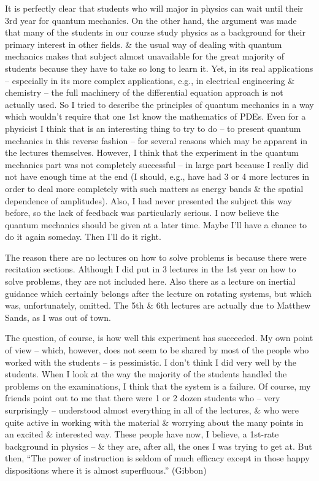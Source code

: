 \documentclass{article}
\begin{document}
It is perfectly clear that students who will major in physics can wait until their 3rd year for quantum mechanics. On the other hand, the argument was made that many of the students in our course study physics as a background for their primary interest in other fields. \& the usual way of dealing with quantum mechanics makes that subject almost unavailable for the great majority of students because they have to take so long to learn it. Yet, in its real applications -- especially in its more complex applications, e.g., in electrical engineering \& chemistry -- the full machinery of the differential equation approach is not actually used. So I tried to describe the principles of quantum mechanics in a way which wouldn't require that one 1st know the mathematics of PDEs. Even for a physicist I think that is an interesting thing to try to do -- to present quantum mechanics in this reverse fashion -- for several reasons which may be apparent in the lectures themselves. However, I think that the experiment in the quantum mechanics part was not completely successful -- in large part because I really did not have enough time at the end (I should, e.g., have had 3 or 4 more lectures in order to deal more completely with such matters as energy bands \& the spatial dependence of amplitudes). Also, I had never presented the subject this way before, so the lack of feedback was particularly serious. I now believe the quantum mechanics should be given at a later time. Maybe I'll have a chance to do it again someday. Then I'll do it right.

The reason there are no lectures on how to solve problems is because there were recitation sections. Although I did put in 3 lectures in the 1st year on how to solve problems, they are not included here. Also there as a lecture on inertial guidance which certainly belongs after the lecture on rotating systems, but which was, unfortunately, omitted. The 5th \& 6th lectures are actually due to {\sc Matthew Sands}, as I was out of town.

The question, of course, is how well this experiment has succeeded. My own point of view -- which, however, does not seem to be shared by most of the people who worked with the students -- is pessimistic. I don't think I did very well by the students. When I look at the way the majority of the students handled the problems on the examinations, I think that the system is a failure. Of course, my friends point out to me that there were 1 or 2 dozen students who -- very surprisingly -- understood almost everything in all of the lectures, \& who were quite active in working with the material \& worrying about the many points in an excited \& interested way. These people have now, I believe, a 1st-rate background in physics -- \& they are, after all, the ones I was trying to get at. But then, ``The power of instruction is seldom of much efficacy except in those happy dispositions where it is almost superfluous.'' (Gibbon)
\end{document}
